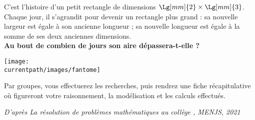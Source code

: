 \begin{enigme}

   \medskip
   
   C’est l’histoire d’un petit rectangle de dimensions $\Lg[mm]{2}\times\Lg[mm]{3}$. \\
      Chaque jour, il s’agrandit pour devenir un rectangle plus grand : sa nouvelle largeur est égale à son ancienne longueur ; sa nouvelle longueur est égale à la somme de ses deux anciennes dimensions. \\
      
      {\bf Au bout de combien de jours son aire dépassera-t-elle  ?} \\
   
      \begin{center}
         \texttt{[image: \\currentpath/images/fantome]}
      \end{center}
      
      Par groupes, vous effectuerez les recherches, puis rendrez une fiche récapitulative où figureront votre raisonnement, la modélisation et les calculs effectués.
        
   \end{enigme}
   
   \vfill \hfill {\it\small D'après \og La résolution de problèmes mathématiques au collège \fg, MENJS, 2021}
   

